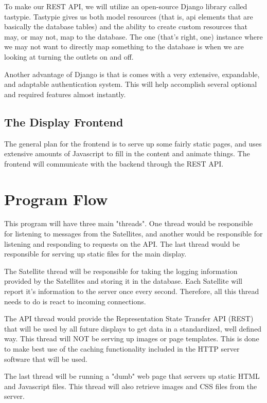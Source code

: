 To make our REST API, we will utilize an open-source Django library called tastypie. Tastypie gives us both model resources (that is, api elements that are basically the database tables) and the ability to create custom resources that may, or may not, map to the database. The one (that's right, one) instance where we may not want to directly map something to the database is when we are looking at turning the outlets on and off.

Another advantage of Django is that is comes with a very extensive, expandable, and adaptable authentication system. This will help accomplish several optional and required features almost instantly. 

\subsection{The Display Frontend}

The general plan for the frontend is to serve up some fairly static pages, and uses extensive amounts of Javascript to fill in the content and animate things. The frontend will communicate with the backend through the REST API.

\section{Program Flow}

This program will have three main "threads". One thread would be responsible for listening to messages from the Satellites, and another would be responsible for listening and responding to requests on the API. The last thread would be responsible for serving up static files for the main display.

The Satellite thread will be responsible for taking the logging information provided by the Satellites and storing it in the database. Each Satellite will report it's information to the server once every second. Therefore, all this thread needs to do is react to incoming connections.

The API thread would provide the Representation State Transfer API (REST) that will be used by all future displays to get data in a standardized, well defined way. This thread will NOT be serving up images or page templates. This is done to make best use of the caching functionality included in the HTTP server software that will be used.

The last thread will be running a "dumb" web page that servers up static HTML and Javascript files. This thread will also retrieve images and CSS files from the server.

